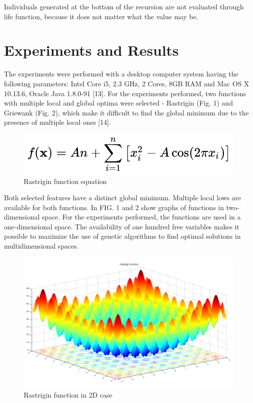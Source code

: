 \documentclass[graybox]{styles/svmult}
\begin{document}
Individuals generated at the bottom of the recursion are not evaluated through life function, because it does not matter what the value may be.

\section{Experiments and Results}
\label{sec:3}

The experiments were performed with a desktop computer system having the following parameters: Intel Core i5, 2.3 GHz, 2 Cores, 8GB RAM and Mac OS X 10.13.6, Oracle Java 1.8.0-91 [13]. For the experiments performed, two functions with multiple local and global optima were selected - Rastrigin (Fig. 1) and Griewank (Fig. 2), which make it difficult to find the global minimum due to the presence of multiple local ones [14].

\begin{figure}[b]
\sidecaption
\includegraphics[width=1.0\textwidth]{images/fig01a}
\caption{Rastrigin function equation}
\label{fig:4}
\end{figure}

Both selected features have a distinct global minimum. Multiple local lows are available for both functions. In FIG. 1 and 2 show graphs of functions in two-dimensional space. For the experiments performed, the functions are used in a one-dimensional space. The availability of one hundred free variables makes it possible to maximize the use of genetic algorithms to find optimal solutions in multidimensional spaces.

\begin{figure}[b]
\sidecaption
\includegraphics[width=1.0\textwidth]{images/fig01b}
\caption{Rastrigin function in 2D case}
\label{fig:5}
\end{figure}
\end{document}
